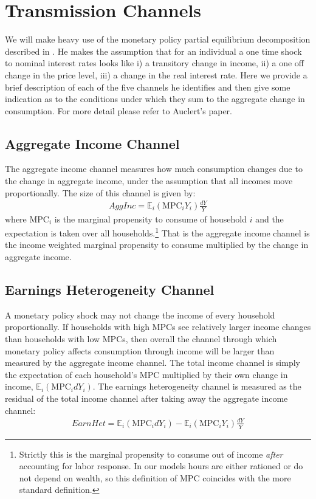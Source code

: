 \documentclass[12pt,a4paper]{article}
\begin{document}
\section{Transmission Channels} \label{transmission_channels}
We will make heavy use of the monetary policy partial equilibrium decomposition described in \cite{auclert_monetary_2017}. He makes the assumption that for an individual a one time shock to nominal interest rates looks like i) a transitory change in income, ii) a one off change in the price level, iii) a change in the real interest rate. Here we provide a brief description of each of the five channels he identifies and then give some indication as to the conditions under which they sum to the aggregate change in consumption. For more detail please refer to Auclert's paper.

\subsection{Aggregate Income Channel}
The aggregate income channel measures how much consumption changes due to the change in aggregate income, under the assumption that all incomes move proportionally. The size of this channel is given by:
\begin{align}
\textit{AggInc} = \mathbb{E}_i \left( \text{MPC}_i Y_i  \right) \frac{dY}{Y}
\end{align}
where $\text{MPC}_i$ is the marginal propensity to consume of household $i$ and the expectation is taken over all households.\footnote{Strictly this is the marginal propensity to consume out of income \textit{after} accounting for labor response. In our models hours are either rationed or do not depend on wealth, so this definition of MPC coincides with the more standard definition.} That is the aggregate income channel is the income weighted marginal propensity to consume multiplied by the change in aggregate income.

\subsection{Earnings Heterogeneity Channel}
A monetary policy shock may not change the income of every household proportionally. If households with high MPCs see relatively larger income changes than households with low MPCs, then overall the channel through which monetary policy affects consumption through income will be larger than measured by the aggregate income channel. The total income channel is simply the expectation of each household's MPC multiplied by their own change in income, $\mathbb{E}_i \left( \text{MPC}_i dY_i  \right) $. The earnings heterogeneity channel is measured as the residual of the total income channel after taking away the aggregate income channel:
\begin{align}
\textit{EarnHet} = \mathbb{E}_i \left( \text{MPC}_i dY_i  \right) - \mathbb{E}_i \left( \text{MPC}_i Y_i  \right) \frac{dY}{Y}
\end{align}
\end{document}

